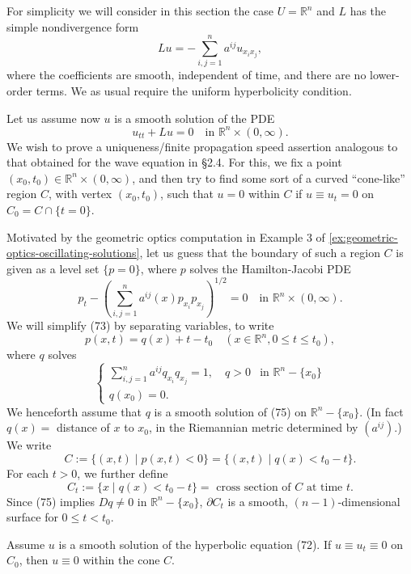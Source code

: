 For simplicity we will consider in this section the case $U = \mathbb{R}^n$ and $L$ has the simple nondivergence form
\[
Lu = -\sum_{i,j=1}^{n} a^{ij}u_{x_ix_j},
\tag{71}
\]
where the coefficients are smooth, independent of time, and there are no lower-order terms. We as usual require the uniform hyperbolicity condition.

Let us assume now $u$ is a smooth solution of the PDE
\[
u_{tt} + Lu = 0 \quad \text{in } \mathbb{R}^n \times (0,\infty).
\tag{72}
\]
We wish to prove a uniqueness/finite propagation speed assertion analogous to that obtained for the wave equation in \S2.4. For this, we fix a point $(x_0, t_0) \in \mathbb{R}^n \times (0,\infty)$, and then try to find some sort of a curved ``cone-like'' region $C$, with vertex $(x_0, t_0)$, such that $u = 0$ within $C$ if $u \equiv u_t = 0$ on $C_0 = C \cap \{t = 0\}$.

Motivated by the geometric optics computation in Example 3 of \cref{ex:geometric-optics-oscillating-solutions}, let us guess that the boundary of such a region $C$ is given as a level set $\{p = 0\}$, where $p$ solves the Hamilton-Jacobi PDE
\[
p_t - \left(\sum_{i,j=1}^n a^{ij}(x)p_{x_i}p_{x_j}\right)^{1/2} = 0 \quad \text{in } \mathbb{R}^n \times (0,\infty).
\tag{73}
\]
We will simplify (73) by separating variables, to write
\[
p(x,t) = q(x) + t - t_0 \quad (x \in \mathbb{R}^n, 0 \le t \le t_0),
\tag{74}
\]
where $q$ solves
\[
\begin{cases}
\sum_{i,j=1}^n a^{ij}q_{x_i}q_{x_j} = 1, \quad q > 0 & \text{in } \mathbb{R}^n - \{x_0\} \\
q(x_0) = 0.
\end{cases}
\tag{75}
\]
We henceforth assume that $q$ is a smooth solution of (75) on $\mathbb{R}^n - \{x_0\}$. (In fact $q(x) =$ distance of $x$ to $x_0$, in the Riemannian metric determined by $(a^{ij})$.) We write
\[
C := \{(x,t) \mid p(x,t) < 0\} = \{(x,t) \mid q(x) < t_0 - t\}.
\]
For each $t > 0$, we further define
\[
C_t := \{x \mid q(x) < t_0 - t\} = \text{ cross section of } C \text{ at time } t.
\tag{76}
\]
Since (75) implies $Dq \ne 0$ in $\mathbb{R}^n - \{x_0\}$, $\partial C_t$ is a smooth, $(n-1)$-dimensional surface for $0 \le t < t_0$.

\begin{theorem}
\label{thm:hyperbolic-finite-propagation-speed}
Assume $u$ is a smooth solution of the hyperbolic equation (72). If $u \equiv u_t \equiv 0$ on $C_0$, then $u \equiv 0$ within the cone $C$.
\end{theorem}

